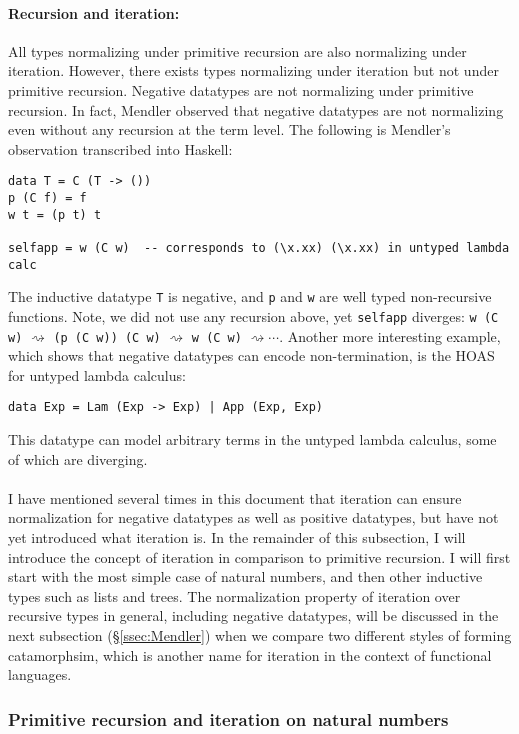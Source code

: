 \paragraph{Recursion and iteration:}
All types normalizing under primitive recursion are also normalizing under
iteration. However, there exists types normalizing under iteration but
not under primitive recursion. Negative datatypes are not normalizing
under primitive recursion. In fact, Mendler observed that negative datatypes
are not normalizing even without any recursion at the term level.
The following is Mendler's observation transcribed into Haskell:
\begin{verbatim}
data T = C (T -> ())
p (C f) = f
w t = (p t) t

selfapp = w (C w)  -- corresponds to (\x.xx) (\x.xx) in untyped lambda calc
\end{verbatim}
The inductive datatype \verb|T| is negative, and \verb|p| and \verb|w| are
well typed non-recursive functions. Note, we did not use any recursion above,
yet \verb|selfapp| diverges:
\verb|w (C w)| $\rightsquigarrow$ 
\verb|(p (C w)) (C w)|  $\rightsquigarrow$
\verb|w (C w)|  $\rightsquigarrow \cdots$.
Another more interesting example, which shows that negative datatypes can
encode non-termination, is the HOAS for untyped lambda calculus:
\begin{verbatim}
data Exp = Lam (Exp -> Exp) | App (Exp, Exp)
\end{verbatim}
This datatype can model arbitrary terms in the untyped lambda calculus,
some of which are diverging.

\paragraph{}
I have mentioned several times in this document that iteration can ensure
normalization for negative datatypes as well as positive datatypes, but
have not yet introduced what iteration is. In the remainder of this subsection,
I will introduce the concept of iteration in comparison to primitive recursion.
I will first start with the most simple case of natural numbers, and then
other inductive types such as lists and trees.
The normalization property of iteration over recursive types in general,
including negative datatypes, will be discussed in the next subsection
(\S\ref{ssec:Mendler}) when we compare two different styles of forming
catamorphsim, which is another name for iteration in the context of
functional languages.

\subsubsection{Primitive recursion and iteration on natural numbers}
\label{sssec:recVSiter}
